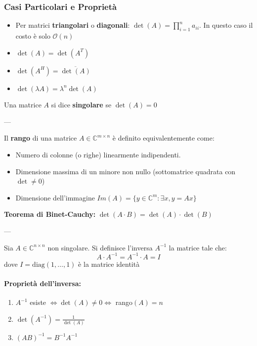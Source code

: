\documentclass[a4paper,12pt]{article}
\begin{document}
	\subsubsection*{Casi Particolari e Proprietà}
	\begin{itemize}
		\item Per matrici \textbf{triangolari} o \textbf{diagonali}: $\det(A) = \prod_{i=1}^n a_{ii}$. In questo caso il costo è solo $\mathcal{O}(n)$
		\item $\det(A) = \det(A^T)$
		\item $\det(A^H) = \overline{\det(A)}$
		\item $\det(\lambda A) = \lambda^n \det(A)$
	\end{itemize}
	
	Una matrice $A$ si dice \textbf{singolare} se $\det(A) = 0$
	
	---
	
	\begin{tcolorbox}[title=Definizione: Rango]
		Il \textbf{rango} di una matrice $A \in \mathbb{C}^{m \times n}$ è definito equivalentemente come:
		\begin{itemize}
			\item Numero di colonne (o righe) linearmente indipendenti.
			\item Dimensione massima di un minore non nullo (sottomatrice quadrata con $\det \neq 0$)
			\item Dimensione dell'immagine $Im(A) = \{y \in \mathbb{C}^m : \exists x, y = Ax\}$
		\end{itemize}
	\end{tcolorbox}
	
	\textbf{Teorema di Binet-Cauchy:} $\det(A \cdot B) = \det(A) \cdot \det(B)$
	
	---
	
	\begin{tcolorbox}[title=Definizione: Matrice Inversa]
		Sia $A \in \mathbb{C}^{n \times n}$ non singolare. Si definisce l'inversa $A^{-1}$ la matrice tale che:
		\[
		A \cdot A^{-1} = A^{-1} \cdot A = I
		\]
		dove $I = \text{diag}(1, \dots, 1)$ è la matrice identità
	\end{tcolorbox}
	
	\paragraph{Proprietà dell'inversa:}
	\begin{enumerate}
		\item $A^{-1}$ esiste $\iff \det(A) \neq 0 \iff$ rango$(A) = n$
		\item $\det(A^{-1}) = \frac{1}{\det(A)}$
		\item $(AB)^{-1} = B^{-1}A^{-1}$
	\end{enumerate}
	
\end{document}
